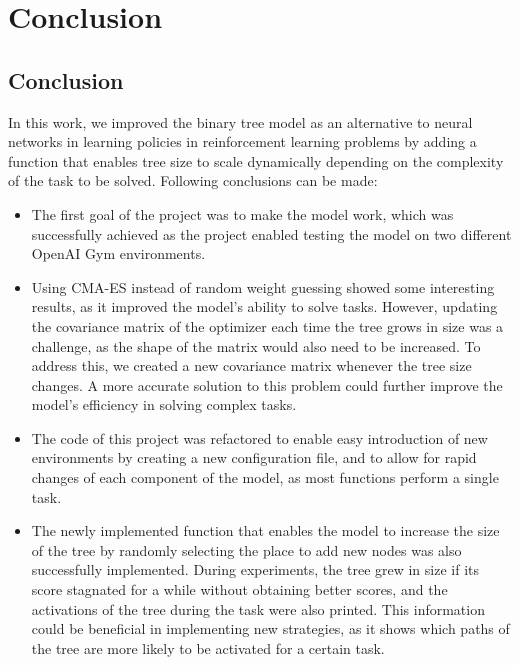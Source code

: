 
\chapter{Conclusion}
\label{ch:conclusions}

\section{Conclusion}
In this work, we improved the binary tree model as an alternative to neural networks in learning policies in reinforcement learning problems by adding a function that enables tree size to scale dynamically depending on the complexity of the task to be solved. Following conclusions can be made:

\begin{itemize}

\item The first goal of the project was to make the model work, which was successfully achieved as the project enabled testing the model on two different OpenAI Gym environments.

\item Using CMA-ES instead of random weight guessing showed some interesting results, as it improved the model's ability to solve tasks. However, updating the covariance matrix of the optimizer each time the tree grows in size was a challenge, as the shape of the matrix would also need to be increased. To address this, we created a new covariance matrix whenever the tree size changes. A more accurate solution to this problem could further improve the model's efficiency in solving complex tasks.

\item The code of this project was refactored to enable easy introduction of new environments by creating a new configuration file, and to allow for rapid changes of each component of the model, as most functions perform a single task.

\item The newly implemented function that enables the model to increase the size of the tree by randomly selecting the place to add new nodes was also successfully implemented. During experiments, the tree grew in size if its score stagnated for a while without obtaining better scores, and the activations of the tree during the task were also printed. This information could be beneficial in implementing new strategies, as it shows which paths of the tree are more likely to be activated for a certain task.
\end{itemize}

